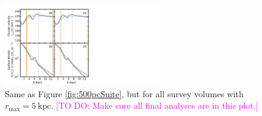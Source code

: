 \documentclass[iop,revtex4,numberedappendix,appendixfloats]{emulateapj}
\newcommand{\Wilma}[1]{\textcolor{Magenta}{#1}}
\begin{document}
\begin{appendix}
\begin{figure}[!htbp]
\centering
\includegraphics[width=0.6\textwidth]{fig/MNdHHdiffSph2_vcirc_surfdens_5kpcSuite.pdf}
\caption{Same as Figure \ref{fig:500pcSuite}, but for all survey volumes with $r_\text{max}=5~\text{kpc}$. \Wilma{[TO DO: Make sure all final analyses are in this plot.]}}
\label{fig:5kpcSuite}
\end{figure}

\end{appendix}
\end{document}
